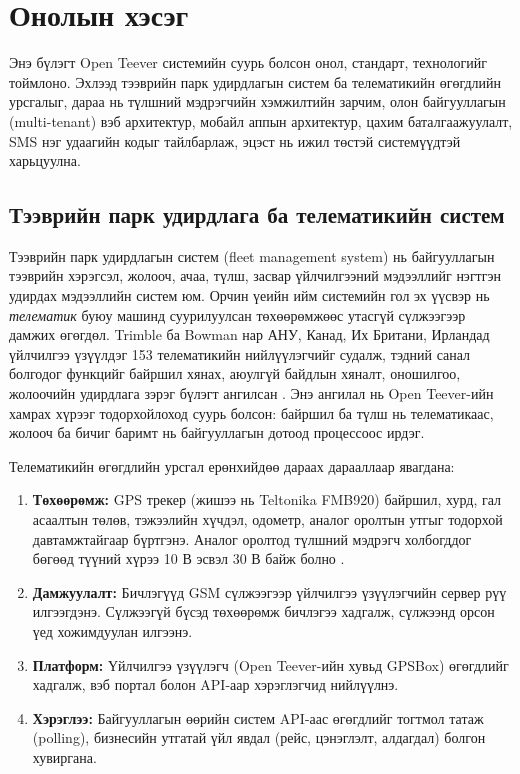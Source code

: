 \documentclass[
12pt,
oneside,
english,
onehalfspacing,
nolistspacing,
headsepline,
]{MUST-Thesis}
\begin{document}
\chapter{Онолын хэсэг}

Энэ бүлэгт Open Teever системийн суурь болсон онол, стандарт, технологийг тоймлоно. Эхлээд тээврийн парк удирдлагын систем ба телематикийн өгөгдлийн урсгалыг, дараа нь түлшний мэдрэгчийн хэмжилтийн зарчим, олон байгууллагын (multi-tenant) вэб архитектур, мобайл аппын архитектур, цахим баталгаажуулалт, SMS нэг удаагийн кодыг тайлбарлаж, эцэст нь ижил төстэй системүүдтэй харьцуулна.

\section{Тээврийн парк удирдлага ба телематикийн систем}

Тээврийн парк удирдлагын систем (fleet management system) нь байгууллагын тээврийн хэрэгсэл, жолооч, ачаа, түлш, засвар үйлчилгээний мэдээллийг нэгтгэн удирдах мэдээллийн систем юм. Орчин үеийн ийм системийн гол эх үүсвэр нь \textit{телематик} буюу машинд суурилуулсан төхөөрөмжөөс утасгүй сүлжээгээр дамжих өгөгдөл. Trimble ба Bowman нар АНУ, Канад, Их Британи, Ирландад үйлчилгээ үзүүлдэг 153 телематикийн нийлүүлэгчийг судалж, тэдний санал болгодог функцийг байршил хянах, аюулгүй байдлын хяналт, оношилгоо, жолоочийн удирдлага зэрэг бүлэгт ангилсан \cite{trimble2012fleet}. Энэ ангилал нь Open Teever-ийн хамрах хүрээг тодорхойлоход суурь болсон: байршил ба түлш нь телематикаас, жолооч ба бичиг баримт нь байгууллагын дотоод процессоос ирдэг.

Телематикийн өгөгдлийн урсгал ерөнхийдөө дараах дарааллаар явагдана:
\begin{enumerate}
    \item \textbf{Төхөөрөмж:} GPS трекер (жишээ нь Teltonika FMB920) байршил, хурд, гал асаалтын төлөв, тэжээлийн хүчдэл, одометр, аналог оролтын утгыг тодорхой давтамжтайгаар бүртгэнэ. Аналог оролтод түлшний мэдрэгч холбогддог бөгөөд түүний хүрээ 10 В эсвэл 30 В байж болно \cite{teltonikafmb920}.
    \item \textbf{Дамжуулалт:} Бичлэгүүд GSM сүлжээгээр үйлчилгээ үзүүлэгчийн сервер рүү илгээгдэнэ. Сүлжээгүй бүсэд төхөөрөмж бичлэгээ хадгалж, сүлжээнд орсон үед хожимдуулан илгээнэ.
    \item \textbf{Платформ:} Үйлчилгээ үзүүлэгч (Open Teever-ийн хувьд GPSBox) өгөгдлийг хадгалж, вэб портал болон API-аар хэрэглэгчид нийлүүлнэ.
    \item \textbf{Хэрэглээ:} Байгууллагын өөрийн систем API-аас өгөгдлийг тогтмол татаж (polling), бизнесийн утгатай үйл явдал (рейс, цэнэглэлт, алдагдал) болгон хувиргана.
\end{enumerate}
\end{document}
